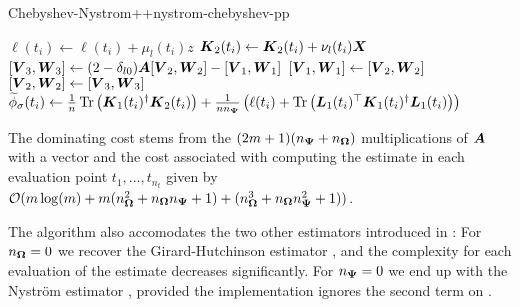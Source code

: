 \documentclass[12pt]{article}
\begin{document}
\begin{algo}{Chebyshev-Nystrom++}{nystrom-chebyshev-pp}
\begin{algorithmic}[1]
            \State $\ell(t_i) \gets \ell(t_i) + \mu_l(t_i) z$ 
        \EndIf
        \State $\boldsymbol{K}_2(t_i) \gets \boldsymbol{K}_2(t_i) + \nu_l(t_i) \boldsymbol{X}$ 
      \EndFor
      \State $[\boldsymbol{V}_3, \boldsymbol{W}_3] \gets (2 - \delta_{l0}) \boldsymbol{A} [\boldsymbol{V}_2, \boldsymbol{W}_2] - [\boldsymbol{V}_1, \boldsymbol{W}_1]$ 
      \State $[\boldsymbol{V}_1, \boldsymbol{W}_1] \gets [\boldsymbol{V}_2, \boldsymbol{W}_2]$
      \State $[\boldsymbol{V}_2, \boldsymbol{W}_2] \gets [\boldsymbol{V}_3, \boldsymbol{W}_3]$
    \EndFor
      \State $\widetilde{\phi}_{\sigma}(t_i) \gets \frac{1}{n} \operatorname{Tr}\left( \boldsymbol{K}_1(t_i)^{\dagger}\boldsymbol{K}_2(t_i) \right) + \frac{1}{n n_{\boldsymbol{\Psi}}} \left( \ell(t_i) + \operatorname{Tr}\left( \boldsymbol{L}_1(t_i)^{\top} \boldsymbol{K}_1(t_i)^{\dagger} \boldsymbol{L}_1(t_i) \right)  \right) $ \label{lin:4-nystromchebyshev-nystrom-pp}
    \EndFor
\end{algorithmic}
\end{algo}

The dominating cost stems from the $(2m + 1)(n_{\boldsymbol{\Psi}} + n_{\boldsymbol{\Omega}})$ multiplications of $\boldsymbol{A}$ with a vector and the cost associated with computing the estimate in each evaluation point $t_1, \dots, t_{n_t}$ given by $\mathcal{O}(m \log(m) + m (n_{\boldsymbol{\Omega}}^2 + n_{\boldsymbol{\Omega}} n_{\boldsymbol{\Psi}} + 1) + (n_{\boldsymbol{\Omega}}^3 + n_{\boldsymbol{\Omega}} n_{\boldsymbol{\Psi}}^2 + 1))$.

The algorithm also accomodates the two other estimators introduced in : For $n_{\boldsymbol{\Omega}} = 0$ we recover the Girard-Hutchinson estimator , and the complexity for each evaluation of the estimate decreases significantly. For $n_{\boldsymbol{\Psi}} = 0$ we end up with the Nyström estimator , provided the implementation ignores the second term on .

\end{document}
